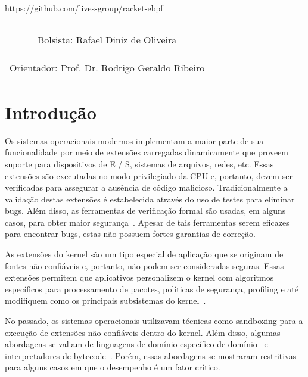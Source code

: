 \documentclass[paper=a4, fontsize=12pt]{article}
\theoremstyle{definition}
\begin{document}
\begin{center}
https://github.com/lives-group/racket-ebpf
\end{center}
\vspace{2cm}
\begin{center}
\begin{tabular}{c}
$\,$  \\
$\,$  \\
\hline
Bolsista: Rafael Diniz de Oliveira\\
$\,$  \\
$\,$  \\
$\,$  \\ \hline
Orientador: Prof. Dr. Rodrigo Geraldo Ribeiro
\end{tabular}
\end{center}



\clearpage

\section{Introdução}

Os sistemas operacionais modernos implementam a maior parte de sua funcionalidade
por meio de extensões carregadas dinamicamente que proveem suporte para dispositivos
de E / S, sistemas de arquivos, redes, etc. Essas extensões são executadas no modo
privilegiado da CPU e, portanto, devem ser verificadas  para assegurar a
ausência de código malicioso. Tradicionalmente a validação destas extensões é
estabelecida através do uso de testes para eliminar bugs. Além disso, as ferramentas de
verificação formal são usadas, em alguns casos, para obter maior segurança~\cite{Ball06,Akash14}.
Apesar de tais ferramentas serem eficazes para encontrar bugs, estas não possuem fortes
garantias de correção.

As extensões do kernel são um tipo especial de aplicação  que se originam de fontes não confiáveis ​​e,
portanto, não podem ser consideradas seguras. Essas extensões ​​permitem que aplicativos personalizem o
kernel com algoritmos específicos para processamento de pacotes, políticas de segurança,
profiling e até modifiquem como os principais subsistemas do kernel~\cite{Nadav17}.

No passado, os sistemas operacionais utilizavam técnicas como sandboxing para a execução de extensões
não confiáveis dentro do kernel. Além disso, algumas abordagens se valiam de linguagens de
domínio específico de domínio~\cite{Bershad95, Fahndrich06} e interpretadores
de bytecode~\cite{McCanne93}. Porém, essas abordagens se mostraram restritivas para alguns casos em que
o desempenho é um fator crítico.
\end{document}

